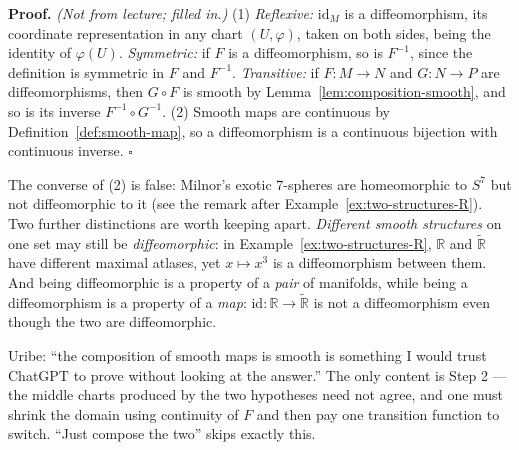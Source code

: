 \documentclass[11pt]{report}
\renewenvironment{proof}[1][Proof]{\noindent\textbf{#1.} }{\hfill$\square$\par\vspace{5pt}}
\begin{document}
\begin{proof}
\textit{(Not from lecture; filled in.)} (1) \emph{Reflexive:} $\mathrm{id}_M$ is a diffeomorphism, its coordinate representation in any chart $(U,\varphi)$, taken on both sides, being the identity of $\varphi(U)$. \emph{Symmetric:} if $F$ is a diffeomorphism, so is $F^{-1}$, since the definition is symmetric in $F$ and $F^{-1}$. \emph{Transitive:} if $F : M \to N$ and $G : N \to P$ are diffeomorphisms, then $G \circ F$ is smooth by Lemma~\ref{lem:composition-smooth}, and so is its inverse $F^{-1} \circ G^{-1}$. (2) Smooth maps are continuous by Definition~\ref{def:smooth-map}, so a diffeomorphism is a continuous bijection with continuous inverse.
\end{proof}

\begin{rembox}\label{rem:smooth-structures-10}
The converse of (2) is false: Milnor's exotic $7$-spheres are homeomorphic to $S^7$ but not diffeomorphic to it (see the remark after Example~\ref{ex:two-structures-R}). Two further distinctions are worth keeping apart. \emph{Different smooth structures} on one set may still be \emph{diffeomorphic}: in Example~\ref{ex:two-structures-R}, $\mathbb{R}$ and $\widetilde{\mathbb{R}}$ have different maximal atlases, yet $x \mapsto x^3$ is a diffeomorphism between them. And being diffeomorphic is a property of a \emph{pair} of manifolds, while being a diffeomorphism is a property of a \emph{map}: $\mathrm{id} : \mathbb{R} \to \widetilde{\mathbb{R}}$ is not a diffeomorphism even though the two are diffeomorphic.
\end{rembox}

\begin{rembox}\label{rem:smooth-structures-11}
Uribe: ``the composition of smooth maps is smooth is something I would trust ChatGPT to prove without looking at the answer.'' The only content is Step 2 --- the middle charts produced by the two hypotheses need not agree, and one must shrink the domain using continuity of $F$ and then pay one transition function to switch. ``Just compose the two'' skips exactly this.
\end{rembox}


\begin{center}
\end{center}
\end{document}
